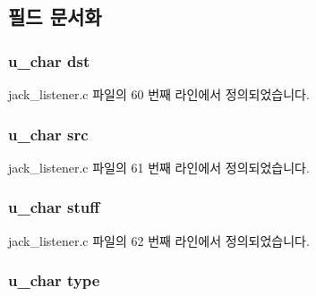 \subsection{필드 문서화}
\subsubsection[{\texorpdfstring{dst}{dst}}]{\setlength{\rightskip}{0pt plus 5cm}u\+\_\+char dst}\hypertarget{structethernet__header_a3bb79d2629c3aa74f5a8a058fce78c7a}{}\label{structethernet__header_a3bb79d2629c3aa74f5a8a058fce78c7a}


jack\+\_\+listener.\+c 파일의 60 번째 라인에서 정의되었습니다.

\subsubsection[{\texorpdfstring{src}{src}}]{\setlength{\rightskip}{0pt plus 5cm}u\+\_\+char src}\hypertarget{structethernet__header_a958aa83d56946de5a5b50cdbc17e055c}{}\label{structethernet__header_a958aa83d56946de5a5b50cdbc17e055c}


jack\+\_\+listener.\+c 파일의 61 번째 라인에서 정의되었습니다.

\subsubsection[{\texorpdfstring{stuff}{stuff}}]{\setlength{\rightskip}{0pt plus 5cm}u\+\_\+char stuff}\hypertarget{structethernet__header_a833470224ab86d3dc30e51fdf787e958}{}\label{structethernet__header_a833470224ab86d3dc30e51fdf787e958}


jack\+\_\+listener.\+c 파일의 62 번째 라인에서 정의되었습니다.

\subsubsection[{\texorpdfstring{type}{type}}]{\setlength{\rightskip}{0pt plus 5cm}u\+\_\+char type}\hypertarget{structethernet__header_a5cfaf0a7a234e912fb06a8b7d1681b65}{}\label{structethernet__header_a5cfaf0a7a234e912fb06a8b7d1681b65}


